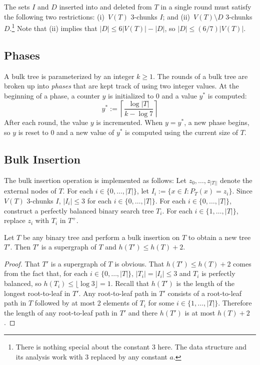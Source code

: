 \documentclass[kpfonts]{patmorin}
\begin{document}
The sets $I$ and $D$ inserted into and deleted from $T$ in a single round must satisfy the following two restrictions: (i)~$V(T)$ $3$-chunks $I$; and (ii)~$V(T)\setminus D$ 3-chunks $D$.\footnote{There is nothing special about the constant $3$ here.  The data structure and its analysis work with $3$ replaced by any constant $a$.}  Note that (ii) implies that $|D|\le 6|V(T)|-|D|$, so $|D|\le (6/7)|V(T)|$.

\subsection{Phases}

A bulk tree is parameterized by an integer $k\ge 1$.  The rounds of a bulk tree are broken up into \emph{phases} that are kept track of using two integer values.  At the beginning of a phase, a counter $y$ is initialized to $0$ and a value $y^*$ is computed:
\[  
  y^* := \left\lceil \frac{\log|T|}{k-\log 7}\right\rceil 
\]
After each round, the value $y$ is incremented.  When $y=y^*$, a new phase begins, so $y$ is reset to 0 and a new value of $y^*$ is computed using the current size of $T$.

\subsection{Bulk Insertion}

The bulk insertion operation is implemented as follows: Let $z_0,\ldots,z_{|T||}$ denote the external nodes of $T$.  For each $i\in\{0,\ldots,|T|\}$, let $I_i:=\{x\in I: P_T(x)=z_i\}$. Since $V(T)$ $3$-chunks $I$, $|I_i|\le 3$ for each $i\in\{0,\ldots,|T|\}$. For each $i\in\{0,\ldots,|T|\}$, construct a perfectly balanced binary search tree $T_i$. For each $i\in\{1,\ldots,|T|\}$, replace $z_i$ with $T_i$ in $T^+$.

\begin{lem}
  Let $T$ be any binary tree and perform a bulk insertion on $T$ to obtain a new tree $T'$.  Then $T'$ is a supergraph of $T$ and $h(T')\le h(T)+2$.
\end{lem}

\begin{proof}
  That $T'$ is a supergraph of $T$ is obvious.  That $h(T')\le h(T)+2$ comes from the fact that, for each $i\in\{0,\ldots,|T|\}$, $|T_i|=|I_i|\le 3$ and $T_i$ is perfectly balanced, so $h(T_i)\le\lfloor\log 3\rfloor = 1$. Recall that $h(T')$ is the length of the longest root-to-leaf in $T'$. Any root-to-leaf path in $T'$ consists of a root-to-leaf path in $T$ followed by at most 2 elements of $T_i$ for some $i\in\{1,\ldots,|T|\}$.  Therefore the length of any root-to-leaf path in $T'$ and there $h(T')$ is at most $h(T)+2$.
\end{proof}
\end{document}
